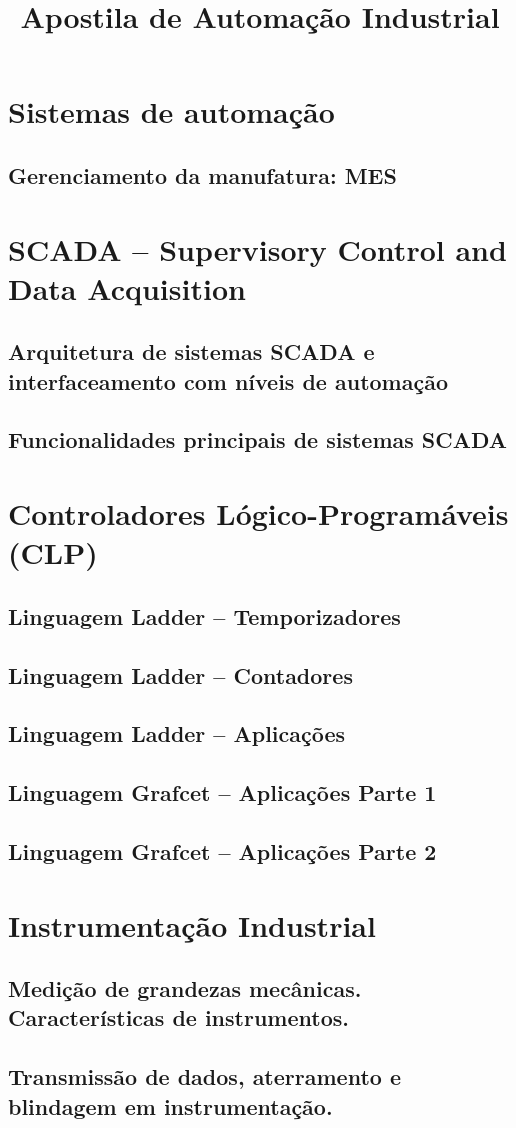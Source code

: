 \documentclass[12pt,oneside]{report}
\title{Apostila de Automação Industrial}
\begin{document}
\maketitle
\tableofcontents
\chapter{Sistemas de automação}
%
%
\section{Gerenciamento da manufatura: MES}
%
\chapter{SCADA -- Supervisory Control and Data Acquisition}
\section{Arquitetura de sistemas SCADA e interfaceamento com níveis de automação}
\section{Funcionalidades principais de sistemas SCADA}
%
\chapter{Controladores Lógico-Programáveis (CLP)}
%


%
\section{Linguagem Ladder – Temporizadores}
\section{Linguagem Ladder – Contadores}
\section{Linguagem Ladder – Aplicações}
%
\section{Linguagem Grafcet – Aplicações Parte 1}
\section{Linguagem Grafcet – Aplicações Parte 2}
\chapter{Instrumentação Industrial}
\section{Medição de grandezas mecânicas. Características de instrumentos.}
\section{Transmissão de dados, aterramento e blindagem em instrumentação.}
\end{document}
